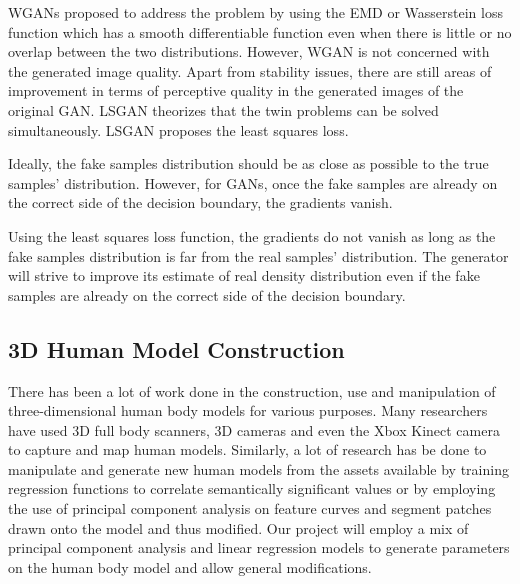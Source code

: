 \documentclass{article}
\begin{document}
WGANs proposed to address the problem by using the EMD or Wasserstein loss function which has a smooth differentiable function even when there is little or no overlap between the two distributions. However, WGAN is not concerned with the generated image quality. Apart from stability issues, there are still areas of improvement in terms of perceptive quality in the generated images of the original GAN. LSGAN theorizes that the twin problems can be solved simultaneously.
LSGAN proposes the least squares loss. 

Ideally, the fake samples distribution should be as close as possible to the true samples' distribution. However, for GANs, once the fake samples are already on the correct side of the decision boundary, the gradients vanish.

 Using the least squares loss function, the gradients do not vanish as long as the fake samples distribution is far from the real samples' distribution. The generator will strive to improve its estimate of real density distribution even if the fake samples are already on the correct side of the decision boundary.
   
    \subsection{3D Human Model Construction }
There has been a lot of work done in the construction, use and manipulation of three-dimensional human body models for various purposes. Many researchers have used 3D full body scanners, 3D cameras and even the Xbox Kinect camera to capture and map human models. Similarly, a lot of research has be done to manipulate and generate new human models from the assets available by training regression functions to correlate semantically significant values or by employing the use of principal component analysis on feature curves and segment patches drawn onto the model and thus modified. Our project will employ a mix of principal component analysis and linear regression models to generate parameters on the human body model and allow general modifications.
\end{document}
